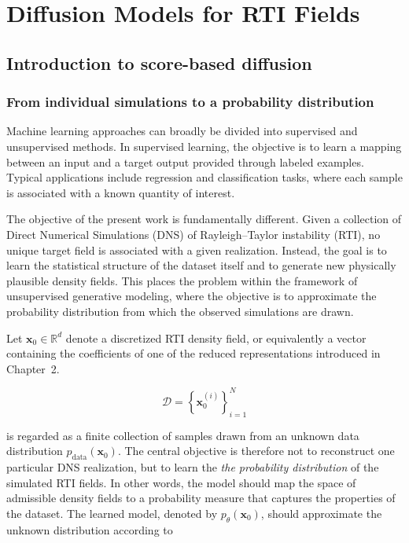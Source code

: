 \chapter{Diffusion Models for RTI Fields}

\section{Introduction to score-based diffusion}

\subsection{From individual simulations to a probability distribution}

Machine learning approaches can broadly be divided into supervised and unsupervised methods. In supervised learning, the objective is to learn a mapping between an input and a target output provided through labeled examples. Typical applications include regression and classification tasks, where each sample is associated with a known quantity of interest.

The objective of the present work is fundamentally different. Given a collection of Direct Numerical Simulations (DNS) of Rayleigh--Taylor instability (RTI), no unique target field is associated with a given realization. Instead, the goal is to learn the statistical structure of the dataset itself and to generate new physically plausible density fields. This places the problem within the framework of unsupervised generative modeling, where the objective is to approximate the probability distribution from which the observed simulations are drawn.

Let $\mathbf{x}_0\in\mathbb{R}^{d}$ denote a discretized RTI density field, or equivalently a vector containing the coefficients of one of the reduced representations introduced in Chapter~2.

\begin{equation}
    \mathcal{D}=\left\{\mathbf{x}_0^{(i)}\right\}_{i=1}^{N}
\end{equation}

is regarded as a finite collection of samples drawn from an unknown data
distribution $p_{\mathrm{data}}(\mathbf{x}_0)$. The central objective is therefore not to reconstruct one particular DNS realization, but to
learn the \emph{the probability distribution} of the simulated RTI
fields. In other words, the model should map the space of admissible density fields to a probability measure that captures the properties of the dataset.
The learned model, denoted by $p_{\theta}(\mathbf{x}_0)$, should approximate the
unknown distribution according to

